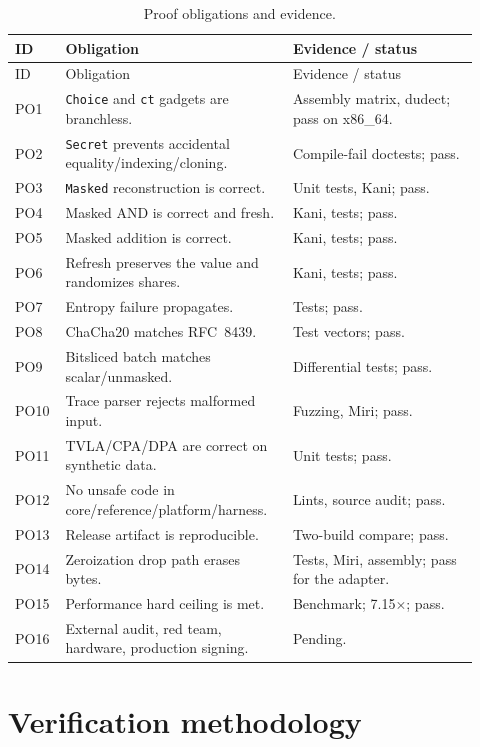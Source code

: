 \documentclass[11pt,a4paper]{article}
\newcommand{\code}[1]{\texttt{#1}}
\theoremstyle{plain}
\theoremstyle{definition}
\theoremstyle{remark}
\begin{document}
\begin{longtable}{@{}p{0.08\linewidth}p{0.46\linewidth}p{0.38\linewidth}@{}}
\caption{Proof obligations and evidence.}\label{tab:obligations}\\
\toprule
ID & Obligation & Evidence / status \\
\midrule
\endfirsthead
\toprule
ID & Obligation & Evidence / status \\
\midrule
\endhead
PO1 & \code{Choice} and \code{ct} gadgets are branchless. & Assembly matrix, dudect; pass on x86\_64. \\
PO2 & \code{Secret} prevents accidental equality/indexing/cloning. & Compile-fail doctests; pass. \\
PO3 & \code{Masked} reconstruction is correct. & Unit tests, Kani; pass. \\
PO4 & Masked AND is correct and fresh. & Kani, tests; pass. \\
PO5 & Masked addition is correct. & Kani, tests; pass. \\
PO6 & Refresh preserves the value and randomizes shares. & Kani, tests; pass. \\
PO7 & Entropy failure propagates. & Tests; pass. \\
PO8 & ChaCha20 matches RFC~8439. & Test vectors; pass. \\
PO9 & Bitsliced batch matches scalar/unmasked. & Differential tests; pass. \\
PO10 & Trace parser rejects malformed input. & Fuzzing, Miri; pass. \\
PO11 & TVLA/CPA/DPA are correct on synthetic data. & Unit tests; pass. \\
PO12 & No unsafe code in core/reference/platform/harness. & Lints, source audit; pass. \\
PO13 & Release artifact is reproducible. & Two-build compare; pass. \\
PO14 & Zeroization drop path erases bytes. & Tests, Miri, assembly; pass for the adapter. \\
PO15 & Performance hard ceiling is met. & Benchmark; 7.15$\times$; pass. \\
PO16 & External audit, red team, hardware, production signing. & Pending. \\
\bottomrule
\end{longtable}

\section{Verification methodology}\label{sec:verification}
\end{document}
